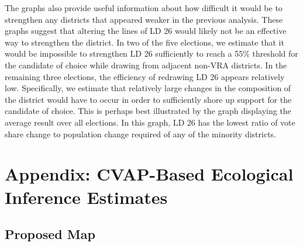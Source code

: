 \documentclass[12pt]{article}
\begin{document}
The graphs also provide useful information about how difficult it would be to strengthen any districts that appeared weaker in the previous analysis. These graphs suggest that altering the lines of LD 26 would likely not be an effective way to strengthen the district. In two of the five elections, we estimate that it would be impossible to strengthen LD 26 sufficiently to reach a 55\% threshold for the candidate of choice while drawing from adjacent non-VRA districts. In the remaining three elections, the efficiency of redrawing LD 26 appears relatively low. Specifically, we estimate that relatively large changes in the composition of the district would have to occur in order to sufficiently shore up support for the candidate of choice. This is perhaps best illustrated by the graph displaying the average result over all elections. In this graph, LD 26 has the lowest ratio of vote share change to population change required of any of the minority districts.

\clearpage
\appendix

\section{Appendix: CVAP-Based Ecological Inference Estimates}
\subsection{Proposed Map}





%






\clearpage




%






\clearpage




%






\clearpage




%






\clearpage




%






\end{document}
